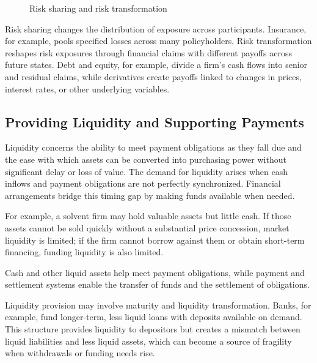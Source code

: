 \begin{figure}[H]

\caption{Risk sharing and risk transformation}
\label{fig:ch1-risk-sharing-transformation}
\end{figure}

Risk sharing changes the distribution of exposure across participants. Insurance, for example, pools specified losses across many policyholders. Risk transformation reshapes risk exposures through financial claims with different payoffs across future states. Debt and equity, for example, divide a firm's cash flows into senior and residual claims, while derivatives create payoffs linked to changes in prices, interest rates, or other underlying variables.


\subsection{Providing Liquidity and Supporting Payments}

Liquidity concerns the ability to meet payment obligations as they fall due and the ease with which assets can be converted into purchasing power without significant delay or loss of value. The demand for liquidity arises when cash inflows and payment obligations are not perfectly synchronized. Financial arrangements bridge this timing gap by making funds available when needed.

For example, a solvent firm may hold valuable assets but little cash. If those assets cannot be sold quickly without a substantial price concession, market liquidity is limited; if the firm cannot borrow against them or obtain short-term financing, funding liquidity is also limited.

Cash and other liquid assets help meet payment obligations, while payment and settlement systems enable the transfer of funds and the settlement of obligations.

Liquidity provision may involve maturity and liquidity transformation. Banks, for example, fund longer-term, less liquid loans with deposits available on demand. This structure provides liquidity to depositors but creates a mismatch between liquid liabilities and less liquid assets, which can become a source of fragility when withdrawals or funding needs rise.

